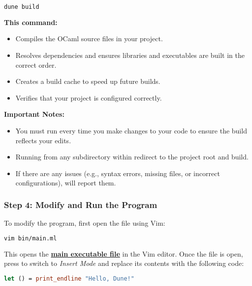 \begin{lstlisting}[language=Bash, caption={Building the Project}]
    dune build
\end{lstlisting}

\noindent
\textbf{This command:}
\begin{itemize}
    \item Compiles the OCaml source files in your project.
    \item Resolves dependencies and ensures libraries and executables are built in the correct order.
    \item Creates a build cache to speed up future builds.
    \item Verifies that your project is configured correctly.
\end{itemize}

\noindent
\textbf{Important Notes:}
\begin{itemize}
    \item You must run  every time you make changes to your code to ensure the build reflects your edits.
    \item Running  from any subdirectory within redirect to the project root and build.
    \item If there are any issues (e.g., syntax errors, missing files, or incorrect configurations),  will report them.
\end{itemize}

\subsubsection{Step 4: Modify and Run the Program}

\noindent
To modify the program, first open the file  using Vim:

\begin{lstlisting}[language=Bash, caption={Opening the File in Vim}]
    vim bin/main.ml
\end{lstlisting}

\noindent
This opens the \underline{\textbf{main executable file}} in the Vim editor. Once the file is open, press  to switch to \textit{Insert Mode} and replace its contents with the following code:

\begin{lstlisting}[language=OCaml, caption={Hello, Dune Program}]
    let () = print_endline "Hello, Dune!"
\end{lstlisting}

